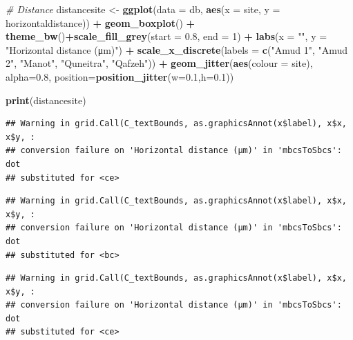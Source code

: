 \documentclass[
]{article}
\newenvironment{Shaded}{\begin{snugshade}}{\end{snugshade}}
\newcommand{\AttributeTok}[1]{\textcolor[rgb]{0.13,0.29,0.53}{#1}}
\newcommand{\CommentTok}[1]{\textcolor[rgb]{0.56,0.35,0.01}{\textit{#1}}}
\newcommand{\DecValTok}[1]{\textcolor[rgb]{0.00,0.00,0.81}{#1}}
\newcommand{\FloatTok}[1]{\textcolor[rgb]{0.00,0.00,0.81}{#1}}
\newcommand{\FunctionTok}[1]{\textcolor[rgb]{0.13,0.29,0.53}{\textbf{#1}}}
\newcommand{\NormalTok}[1]{#1}
\newcommand{\OtherTok}[1]{\textcolor[rgb]{0.56,0.35,0.01}{#1}}
\newcommand{\SpecialCharTok}[1]{\textcolor[rgb]{0.81,0.36,0.00}{\textbf{#1}}}
\newcommand{\StringTok}[1]{\textcolor[rgb]{0.31,0.60,0.02}{#1}}
\begin{document}
\begin{Shaded}
\begin{Highlighting}[]
\CommentTok{\# Distance}
\NormalTok{distancesite }\OtherTok{\textless{}{-}} \FunctionTok{ggplot}\NormalTok{(}\AttributeTok{data =}\NormalTok{ db, }\FunctionTok{aes}\NormalTok{(}\AttributeTok{x =}\NormalTok{ site, }\AttributeTok{y =}\NormalTok{ horizontaldistance)) }\SpecialCharTok{+}  
           \FunctionTok{geom\_boxplot}\NormalTok{() }\SpecialCharTok{+}
           \FunctionTok{theme\_bw}\NormalTok{()}\SpecialCharTok{+}\FunctionTok{scale\_fill\_grey}\NormalTok{(}\AttributeTok{start =} \FloatTok{0.8}\NormalTok{, }\AttributeTok{end =} \DecValTok{1}\NormalTok{) }\SpecialCharTok{+}
           \FunctionTok{labs}\NormalTok{(}\AttributeTok{x =} \StringTok{""}\NormalTok{, }\AttributeTok{y =} \StringTok{"Horizontal distance (μm)"}\NormalTok{) }\SpecialCharTok{+}
           \FunctionTok{scale\_x\_discrete}\NormalTok{(}\AttributeTok{labels =} \FunctionTok{c}\NormalTok{(}\StringTok{"Amud 1"}\NormalTok{, }\StringTok{"Amud 2"}\NormalTok{, }\StringTok{"Manot"}\NormalTok{, }\StringTok{"Quneitra"}\NormalTok{, }\StringTok{"Qafzeh"}\NormalTok{)) }\SpecialCharTok{+}
           \FunctionTok{geom\_jitter}\NormalTok{(}\FunctionTok{aes}\NormalTok{(}\AttributeTok{colour =}\NormalTok{ site), }\AttributeTok{alpha=}\FloatTok{0.8}\NormalTok{, }\AttributeTok{position=}\FunctionTok{position\_jitter}\NormalTok{(}\AttributeTok{w=}\FloatTok{0.1}\NormalTok{,}\AttributeTok{h=}\FloatTok{0.1}\NormalTok{))}

\FunctionTok{print}\NormalTok{(distancesite)}
\end{Highlighting}
\end{Shaded}

\begin{verbatim}
## Warning in grid.Call(C_textBounds, as.graphicsAnnot(x$label), x$x, x$y, :
## conversion failure on 'Horizontal distance (μm)' in 'mbcsToSbcs': dot
## substituted for <ce>
\end{verbatim}

\begin{verbatim}
## Warning in grid.Call(C_textBounds, as.graphicsAnnot(x$label), x$x, x$y, :
## conversion failure on 'Horizontal distance (μm)' in 'mbcsToSbcs': dot
## substituted for <bc>
\end{verbatim}

\begin{verbatim}
## Warning in grid.Call(C_textBounds, as.graphicsAnnot(x$label), x$x, x$y, :
## conversion failure on 'Horizontal distance (μm)' in 'mbcsToSbcs': dot
## substituted for <ce>
\end{verbatim}
\end{document}
